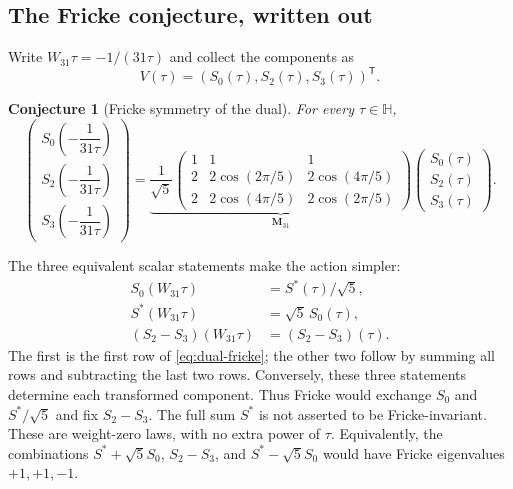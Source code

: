 \documentclass[11pt,reqno]{amsart}
\newcommand{\HH}{\mathbb H}
\newtheorem{conjecture}[theorem]{Conjecture}
\theoremstyle{remark}
\numberwithin{equation}{section}
\begin{document}
\subsection{The Fricke conjecture, written out}
Write $W_{31}\tau=-1/(31\tau)$ and collect the components as
\[
 V(\tau)=(S_0(\tau),S_2(\tau),S_3(\tau))^{\mathsf T}.
\]

\begin{conjecture}[Fricke symmetry of the dual]\label{conj:dual-fricke}
For every $\tau\in\HH$,
\begin{equation}\label{eq:dual-fricke}
 \begin{pmatrix}
 S_0\!\left(-\dfrac1{31\tau}\right)\\[3pt]
 S_2\!\left(-\dfrac1{31\tau}\right)\\[3pt]
 S_3\!\left(-\dfrac1{31\tau}\right)
 \end{pmatrix}
 =\underbrace{\frac1{\sqrt5}
 \begin{pmatrix}
 1&1&1\\
 2&2\cos(2\pi/5)&2\cos(4\pi/5)\\
 2&2\cos(4\pi/5)&2\cos(2\pi/5)
 \end{pmatrix}}_{\displaystyle\mathbf M_{31}}
 \begin{pmatrix}S_0(\tau)\\S_2(\tau)\\S_3(\tau)\end{pmatrix}.
\end{equation}
\end{conjecture}

The three equivalent scalar statements make the action simpler:
\begin{equation}\label{eq:dual-exchange}
\begin{aligned}
 S_0(W_{31}\tau)&=S^*(\tau)/\sqrt5,\\
 S^*(W_{31}\tau)&=\sqrt5\,S_0(\tau),\\
 (S_2-S_3)(W_{31}\tau)&=(S_2-S_3)(\tau).
\end{aligned}
\end{equation}
The first is the first row of \eqref{eq:dual-fricke}; the other two
follow by summing all rows and subtracting the last two rows.
Conversely, these three statements determine each transformed
component. Thus Fricke would exchange $S_0$ and $S^*/\sqrt5$ and
fix $S_2-S_3$. The full sum $S^*$ is not asserted to be
Fricke-invariant. These are weight-zero laws, with no extra power of
$\tau$. Equivalently, the combinations
$S^*+\sqrt5S_0$, $S_2-S_3$, and $S^*-\sqrt5S_0$ would have
Fricke eigenvalues $+1,+1,-1$.
\end{document}
